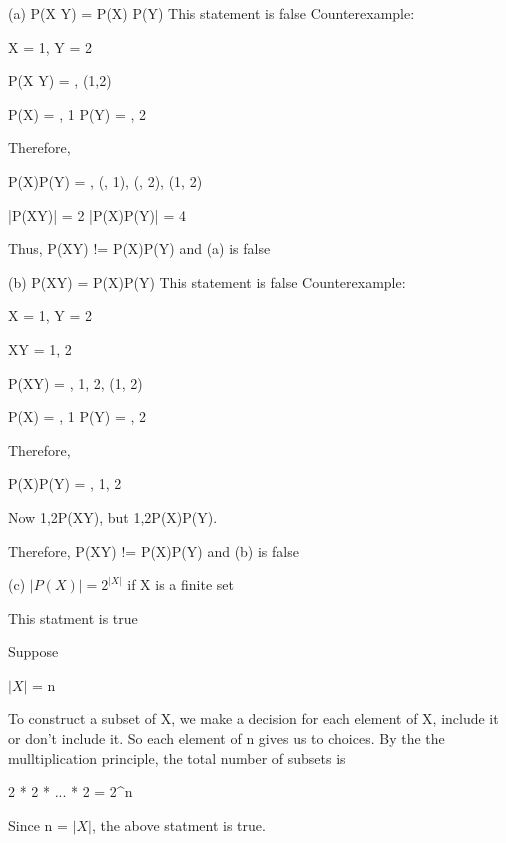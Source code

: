 (a) P(X \times Y) = P(X) \times P(Y)
This statement is false
Counterexample:

X = {1}, Y = {2}

P(X \times Y) = {\emptyset, {(1,2)}}

P(X) = {\emptyset, 1}
P(Y) = {\emptyset, 2}

Therefore,

P(X)\times P(Y) = {\emptyset, (\emptyset, {1}), (\emptyset, {2}), ({1}, {2})}

|P(X\times Y)| = 2
|P(X)\times P(Y)| = 4

Thus, P(X\times Y) != P(X)\times P(Y) and (a) is false

(b) P(X\cup Y) = P(X)\cup P(Y)
This statement is false
Counterexample:

X = {1}, Y = {2}

X\cup Y = {1, 2}

P(X\cup Y) = {\emptyset, {1}, {2}, ({1, 2})}

P(X) = {\emptyset, 1}
P(Y) = {\emptyset, 2}

Therefore,

P(X)\cup P(Y) = {\emptyset, {1}, {2}}

Now {1,2}\in P(X\cup Y), but {1,2}\notin P(X)\cup P(Y).

Therefore, P(X\cup Y) != P(X)\cup P(Y) and (b) is false

(c) \(|P(X)|=2^{|X|}\) if X is a finite set

This statment is true

Suppose

\(|X|\) = n

To construct a subset of X, we make a decision for each element of X, include it or don't include it. So each element of n gives us to choices. By the the mulltiplication principle, the total number of subsets is

2 * 2 * ... * 2 = 2^{n}

Since n = \(|X|\), the above statment is true.



